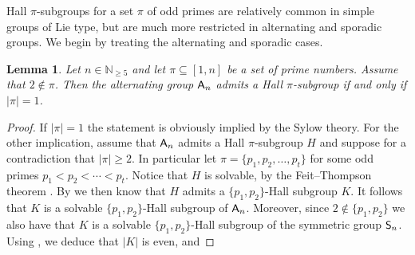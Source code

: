 \documentclass[12pt]{amsart}
\newtheorem{lemma}[theorem]{Lemma}
\theoremstyle{definition}
\numberwithin{equation}{section}
\newcommand{\Al}{\textup{\textsf{A}}}
\newcommand{\Sy}{\textup{\textsf{S}}}
\begin{document}
Hall $\pi$-subgroups for a set $\pi$ of odd primes are relatively
common in simple groups of Lie type, but are much more restricted in
alternating and sporadic groups. We begin by treating the
alternating and sporadic cases.

\begin{lemma}\label{lem:noHall}
Let $n\in\mathbb{N}_{\geq 5}$ and %
let $\pi\subseteq [1,n]$ be a set
of prime numbers. Assume that $2\notin\pi$. Then the alternating
group $\Al_n$ admits a Hall $\pi$-subgroup if and only if $|\pi|=1$.
\end{lemma}

\begin{proof}
If $|\pi|=1$ the %
statement is obviously implied by the Sylow theory.
For the other implication, assume that $\Al_n$ admits a Hall
$\pi$-subgroup $H$ and suppose for a contradiction that $|\pi|\geq
2$. %
In particular let $\pi=\{p_1,p_2,\ldots, p_t\}$ for %
some odd
primes $p_1<p_2<\cdots<p_t$. %
Notice that $H$ is solvable, by the Feit--Thompson theorem
\cite{Thompson63}. By \cite{Hall1} we then know that $H$ admits %
a
$\{p_1,p_2\}$-Hall subgroup %
$K$. It follows that $K$ is a solvable
$\{p_1,p_2\}$-Hall subgroup of $\Al_n$. Moreover, since $2\notin
\{p_1,p_2\}$ we also have that $K$ is a solvable $\{p_1,p_2\}$-Hall
subgroup of the symmetric group $\Sy_n$. Using \cite[Theorem
A4]{Hall2}, we deduce that $|K|$ is even, and %

\end{proof}
\end{document}
